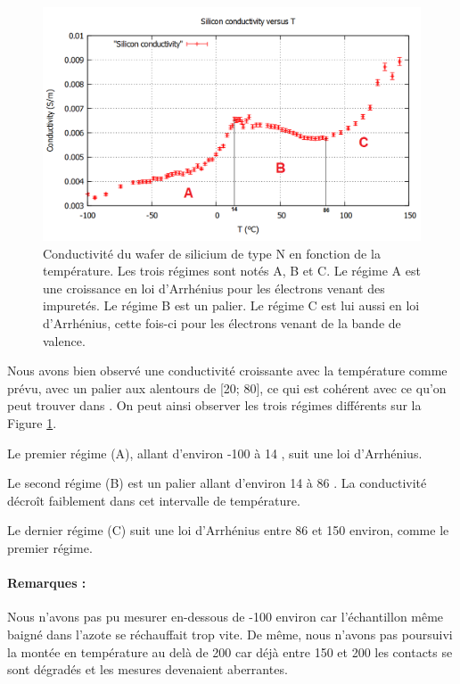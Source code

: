 \begin{figure}[hb]
  \begin{center}
		\includegraphics[width=12cm]{./images/Conductivite_Silicium_finale_english.png}
		\caption{Conductivité du wafer de silicium de type N en fonction de la température. Les trois régimes sont notés A, B et C. Le régime A est une croissance en loi d'Arrhénius pour les électrons venant des impuretés. Le régime B est un palier. Le régime C est lui aussi en loi d'Arrhénius, cette fois-ci pour les électrons venant de la bande de valence.}
		\label{courbe_silicium}
	\end{center}
\end{figure}

\newpage

Nous avons bien observé une conductivité croissante avec la température comme prévu, avec un palier aux alentours de [20\celsius{}; 80\celsius{}], ce qui est cohérent avec ce qu'on peut trouver dans \cite{kittel_introduction_1976}. On peut ainsi observer les trois régimes différents sur la Figure \ref{courbe_silicium}.

Le premier régime (A), allant d'environ -100 \celsius{} à 14 \celsius{}, suit une loi d'Arrhénius. 

Le second régime (B) est un palier allant d'environ 14 \celsius{} à 86 \celsius{}. La conductivité 
décroît faiblement dans cet intervalle de température. 

Le dernier régime (C) suit une loi d'Arrhénius entre 86 \celsius{} et 150 \celsius{} environ, comme le premier régime.


\paragraph{Remarques :}
Nous n'avons pas pu mesurer en-dessous de -100 \celsius{} environ car l'échantillon même baigné dans l'azote se réchauffait trop vite. De même, nous n'avons pas poursuivi la montée en température au delà de 200 \celsius{} car déjà entre 150 \celsius{} et 200 \celsius{} les contacts se sont dégradés et les mesures devenaient aberrantes.

